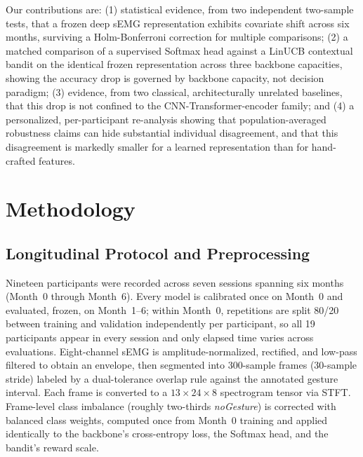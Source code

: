 \documentclass{article}
\begin{document}
Our contributions are: (1) statistical evidence, from two independent two-sample tests, that a frozen deep sEMG representation exhibits covariate shift across six months, surviving a Holm-Bonferroni correction for multiple comparisons; (2) a matched comparison of a supervised Softmax head against a LinUCB contextual bandit on the identical frozen representation across three backbone capacities, showing the accuracy drop is governed by backbone capacity, not decision paradigm; (3) evidence, from two classical, architecturally unrelated baselines, that this drop is not confined to the CNN-Transformer-encoder family; and (4) a personalized, per-participant re-analysis showing that population-averaged robustness claims can hide substantial individual disagreement, and that this disagreement is markedly smaller for a learned representation than for hand-crafted features.

\section{Methodology}
\label{sec:method}

\subsection{Longitudinal Protocol and Preprocessing}
Nineteen participants were recorded across seven sessions spanning six months (Month~0 through Month~6). Every model is calibrated once on Month~0 and evaluated, frozen, on Month~1--6; within Month~0, repetitions are split 80/20 between training and validation independently per participant, so all 19 participants appear in every session and only elapsed time varies across evaluations. Eight-channel sEMG is amplitude-normalized, rectified, and low-pass filtered to obtain an envelope, then segmented into 300-sample frames (30-sample stride) labeled by a dual-tolerance overlap rule against the annotated gesture interval. Each frame is converted to a $13\times24\times8$ spectrogram tensor via STFT. Frame-level class imbalance (roughly two-thirds \emph{noGesture}) is corrected with balanced class weights, computed once from Month~0 training and applied identically to the backbone's cross-entropy loss, the Softmax head, and the bandit's reward scale.
\end{document}
